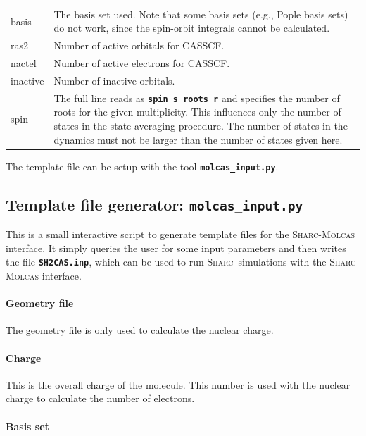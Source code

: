\documentclass[a4paper,11pt,DIV=15,openany,twoside=false]{scrbook}
\newcommand{\sharc}{\textsc{Sharc}}
\newcommand{\ttt}[1]{\textbf{\texttt{#1}}}
\begin{document}
\begin{tabular}{lp{12cm}}
basis           &The basis set used. Note that some basis sets (e.g., Pople basis sets) do not work, since the spin-orbit integrals cannot be calculated.\\
ras2            &Number of active orbitals for CASSCF.\\
nactel          &Number of active electrons for CASSCF.\\
inactive        &Number of inactive orbitals.\\
spin            &The full line reads as \ttt{spin s roots r} and specifies the number of roots for the given multiplicity. This influences only the number of states in the state-averaging procedure. The number of states in the dynamics must not be larger than the number of states given here.\\
\end{tabular}

The template file can be setup with the tool \ttt{molcas\_input.py}.

\subsection{Template file generator: \ttt{molcas\_input.py}}\label{sec:molcas_input.py}

This is a small interactive script to generate template files for the \sharc-\textsc{Molcas} interface. It simply queries the user for some input parameters and then writes the file \ttt{SH2CAS.inp}, which can be used to run \sharc\ simulations with the \sharc-\textsc{Molcas} interface.

\paragraph{Geometry file}

The geometry file is only used to calculate the nuclear charge.

\paragraph{Charge}

This is the overall charge of the molecule. This number is used with the nuclear charge to calculate the number of electrons.

\paragraph{Basis set}
\end{document}
